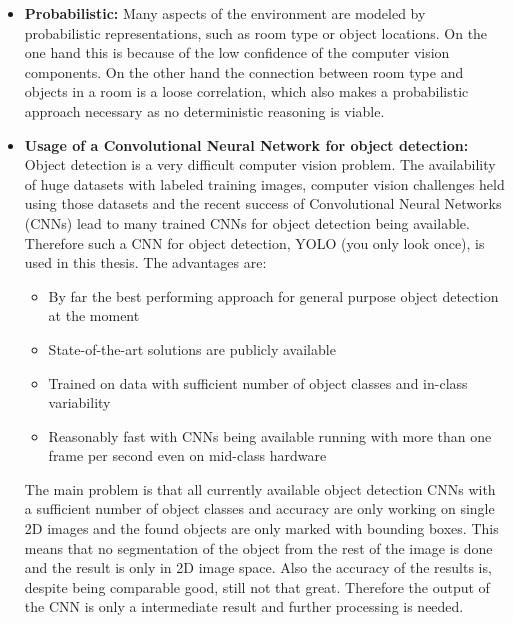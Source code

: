 \begin{itemize}
 \item \textbf{Probabilistic:}\newline
 Many aspects of the environment are modeled by probabilistic representations, such as room type or object locations. On the one hand this is because of the low confidence of the computer vision components. On the other hand the connection between room type and objects in a room is a loose correlation, which also makes a probabilistic approach necessary as no deterministic reasoning is viable.
 \newline
 
 \item \textbf{Usage of a Convolutional Neural Network for object detection:} \newline
 Object detection is a very difficult computer vision problem. The availability of huge datasets with labeled training images, computer vision challenges held using those datasets and the recent success of Convolutional Neural Networks (CNNs) lead to many trained CNNs for object detection being available. Therefore such a CNN for object detection, YOLO (you only look once), is used in this thesis.\newline
 The advantages are:
 \begin{itemize}
  \item By far the best performing approach for general purpose object detection at the moment
  \item State-of-the-art solutions are publicly available
  \item Trained on data with sufficient number of object classes and in-class variability
  \item Reasonably fast with CNNs being available running with more than one frame per second even on mid-class hardware
 \end{itemize}
 The main problem is that all currently available object detection CNNs with a sufficient number of object classes and accuracy are only working on single 2D images and the found objects are only marked with bounding boxes. This means that no segmentation of the object from the rest of the image is done and the result is only in 2D image space. Also the accuracy of the results is, despite being comparable good, still not that great. Therefore the output of the CNN is only a intermediate result and further processing is needed.
 \newline
 

\end{itemize}
